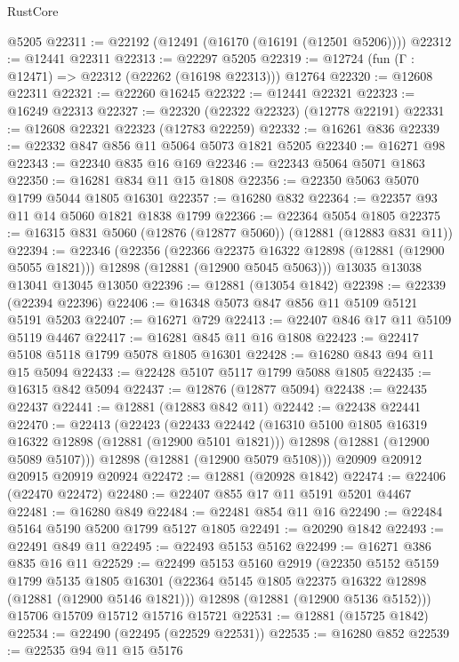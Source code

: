\begin{lexlean}{RustCore}
\begin{coremodule}
    @5205
@22311 := @22192 (@12491 (@16170 (@16191 (@12501 @5206))))
@22312 := @12441 @22311
@22313 := @22297 @5205
@22319 := @12724 (fun (Γ : @12471) => @22312 (@22262 (@16198 @22313))) @12764
@22320 := @12608 @22311
@22321 := @22260 @16245
@22322 := @12441 @22321
@22323 := @16249 @22313
@22327 := @22320 (@22322 @22323) (@12778 @22191)
@22331 := @12608 @22321 @22323 (@12783 @22259)
@22332 := @16261 @836
@22339 := @22332 @847 @856 @11 @5064 @5073 @1821 @5205
@22340 := @16271 @98
@22343 := @22340 @835 @16 @169
@22346 := @22343 @5064 @5071 @1863
@22350 := @16281 @834 @11 @15 @1808
@22356 := @22350 @5063 @5070 @1799 @5044 @1805 @16301
@22357 := @16280 @832
@22364 := @22357 @93 @11 @14 @5060 @1821 @1838 @1799
@22366 := @22364 @5054 @1805
@22375 := @16315 @831 @5060 (@12876 (@12877 @5060)) (@12881 (@12883 @831 @11))
@22394 := @22346
    (@22356
      (@22366 @22375 @16322 @12898 (@12881 (@12900 @5055 @1821)))
      @12898
      (@12881 (@12900 @5045 @5063)))
    @13035
    @13038
    @13041
    @13045
    @13050
@22396 := @12881 (@13054 @1842)
@22398 := @22339 (@22394 @22396)
@22406 := @16348 @5073 @847 @856 @11 @5109 @5121 @5191 @5203
@22407 := @16271 @729
@22413 := @22407 @846 @17 @11 @5109 @5119 @4467
@22417 := @16281 @845 @11 @16 @1808
@22423 := @22417 @5108 @5118 @1799 @5078 @1805 @16301
@22428 := @16280 @843 @94 @11 @15 @5094
@22433 := @22428 @5107 @5117 @1799 @5088 @1805
@22435 := @16315 @842 @5094
@22437 := @12876 (@12877 @5094)
@22438 := @22435 @22437
@22441 := @12881 (@12883 @842 @11)
@22442 := @22438 @22441
@22470 := @22413
    (@22423
      (@22433
        @22442
        (@16310 @5100 @1805 @16319 @16322 @12898 (@12881 (@12900 @5101 @1821)))
        @12898
        (@12881 (@12900 @5089 @5107)))
      @12898
      (@12881 (@12900 @5079 @5108)))
    @20909
    @20912
    @20915
    @20919
    @20924
@22472 := @12881 (@20928 @1842)
@22474 := @22406 (@22470 @22472)
@22480 := @22407 @855 @17 @11 @5191 @5201 @4467
@22481 := @16280 @849
@22484 := @22481 @854 @11 @16
@22490 := @22484 @5164 @5190 @5200 @1799 @5127 @1805
@22491 := @20290 @1842
@22493 := @22491 @849 @11
@22495 := @22493 @5153 @5162
@22499 := @16271 @386 @835 @16 @11
@22529 := @22499
    @5153
    @5160
    @2919
    (@22350
      @5152
      @5159
      @1799
      @5135
      @1805
      @16301
      (@22364 @5145 @1805 @22375 @16322 @12898 (@12881 (@12900 @5146 @1821)))
      @12898
      (@12881 (@12900 @5136 @5152)))
    @15706
    @15709
    @15712
    @15716
    @15721
@22531 := @12881 (@15725 @1842)
@22534 := @22490 (@22495 (@22529 @22531))
@22535 := @16280 @852
@22539 := @22535 @94 @11 @15 @5176

\end{coremodule}
\end{lexlean}
